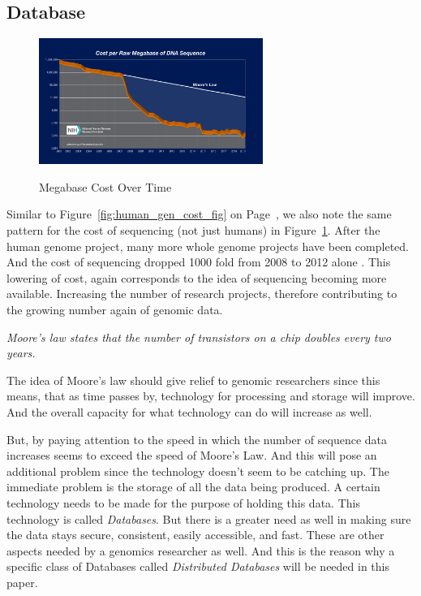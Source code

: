 \documentclass[acmsmall]{acmart}
\begin{document}
\subsection{Database}

\begin{figure}[h]
\caption{Megabase Cost Over Time}
\centering
\includegraphics[width=0.65\textwidth]{images/seq-cost.jpeg} 
\label{fig:megabase_cost_fig}
\end{figure}

Similar to Figure~\ref{fig:human_gen_cost_fig} on Page~\pageref{fig:human_gen_cost_fig}, we also note the same pattern for the cost of sequencing (not just humans) in Figure~\ref{fig:megabase_cost_fig}\cite{genomics-cost}. After the human genome project, many more whole genome projects have been completed. And the cost of sequencing dropped 1000 fold from 2008 to 2012 alone \cite{bon_compression}. This lowering of cost, again corresponds to the idea of sequencing becoming more available. Increasing the number of research projects, therefore contributing to the growing number again of genomic data.
 
\begin{center}
\textit{Moore's law states that the number of transistors on a chip doubles every two years.}\cite{kurose}
\end{center}

The idea of Moore's law should give relief to genomic researchers since this means, that as time passes by, technology for processing and storage will improve. And the overall capacity for what technology can do will increase as well. 

But, by paying attention to the speed in which the number of sequence data increases seems to exceed the speed of Moore's Law. And this will pose an additional problem since the technology doesn't seem to be catching up. The immediate problem is the storage of all the data being produced. A certain technology needs to be made for the purpose of holding this data. This technology is called \textit{Databases}. But there is a greater need as well in making sure the data stays secure, consistent, easily accessible, and fast. These are other aspects needed by a genomics researcher as well. And this is the reason why a specific class of Databases called \textit{Distributed Databases} will be needed in this paper.
\end{document}
